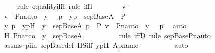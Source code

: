 \begin{isabellebody}
\ \ \ \ \isamarkupfalse%
{\isacharparenleft}{\kern0pt}rule\ equality{\isacharunderscore}{\kern0pt}iffI{\isacharcomma}{\kern0pt}\ rule\ iffI{\isacharparenright}{\kern0pt}\isanewline
\ \ \ \ \ \ \isamarkupfalse%
\ v\ \isamarkupfalse%
\ {\isachardoublequoteopen}v\ {\isasymin}\ {\isacharbraceleft}{\kern0pt}{\isasymlangle}Pn{\isacharunderscore}{\kern0pt}auto{\isacharparenleft}{\kern0pt}{\isasympi}{\isacharparenright}{\kern0pt}\ {\isacharbackquote}{\kern0pt}\ y{\isacharcomma}{\kern0pt}\ {\isasympi}\ {\isacharbackquote}{\kern0pt}\ p{\isasymrangle}\ {\isachardot}{\kern0pt}\ {\isasymlangle}y{\isacharcomma}{\kern0pt}p{\isasymrangle}\ {\isasymin}\ sep{\isacharunderscore}{\kern0pt}Base{\isacharparenleft}{\kern0pt}A{\isacharparenright}{\kern0pt}\ {\isasymtimes}\ P{\isacharbraceright}{\kern0pt}{\isachardoublequoteclose}\ \isanewline
\ \ \ \ \ \ \isamarkupfalse%
\ \isamarkupfalse%
\ y\ p\ \ ypH\ {\isacharcolon}{\kern0pt}\ {\isachardoublequoteopen}y\ {\isasymin}\ sep{\isacharunderscore}{\kern0pt}Base{\isacharparenleft}{\kern0pt}A{\isacharparenright}{\kern0pt}{\isachardoublequoteclose}\ {\isachardoublequoteopen}p\ {\isasymin}\ P{\isachardoublequoteclose}\ {\isachardoublequoteopen}v\ {\isacharequal}{\kern0pt}\ {\isasymlangle}Pn{\isacharunderscore}{\kern0pt}auto{\isacharparenleft}{\kern0pt}{\isasympi}{\isacharparenright}{\kern0pt}\ {\isacharbackquote}{\kern0pt}\ y{\isacharcomma}{\kern0pt}\ {\isasympi}\ {\isacharbackquote}{\kern0pt}\ p{\isasymrangle}{\isachardoublequoteclose}\ \isamarkupfalse%
\ auto\isanewline
\isanewline
\ \ \ \ \ \ \isamarkupfalse%
\ H{}{\isacharcolon}{\kern0pt}\ {\isachardoublequoteopen}Pn{\isacharunderscore}{\kern0pt}auto{\isacharparenleft}{\kern0pt}{\isasympi}{\isacharparenright}{\kern0pt}\ {\isacharbackquote}{\kern0pt}\ y\ {\isasymin}\ sep{\isacharunderscore}{\kern0pt}Base{\isacharparenleft}{\kern0pt}A{\isacharparenright}{\kern0pt}{\isachardoublequoteclose}\ \isanewline
\ \ \ \ \ \ \ \ \isamarkupfalse%
{\isacharparenleft}{\kern0pt}rule\ iffD{}{\isacharcomma}{\kern0pt}\ rule\ sep{\isacharunderscore}{\kern0pt}Base{\isacharunderscore}{\kern0pt}Pn{\isacharunderscore}{\kern0pt}auto{\isacharparenright}{\kern0pt}\isanewline
\ \ \ \ \ \ \ \ \isamarkupfalse%
\ assms\ piin\ sep{\isacharunderscore}{\kern0pt}Base{\isacharunderscore}{\kern0pt}def\ HS{\isacharunderscore}{\kern0pt}iff\ ypH\ Apname\isanewline
\ \ \ \ \ \ \ \ \isamarkupfalse%
\ auto\isanewline

\end{isabellebody}
